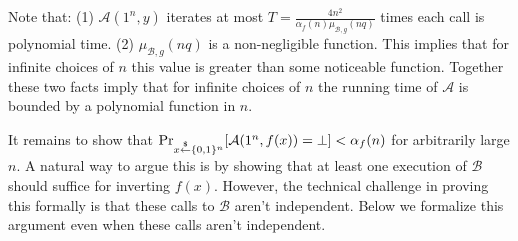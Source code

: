 Note that: (1) $\mathcal{A}(1^n, y)$ iterates at most $T = \frac{4n^2}{\alpha_f(n)\mu_{\mathcal{B},g}(nq)}$ times each call is polynomial time. (2) $\mu_{\mathcal{B},g}(nq)$ is a non-negligible function. This implies that for infinite choices of $n$ this value is greater than some noticeable function. Together these two facts imply that for infinite choices of $n$ the running time of $\mathcal{A}$ is bounded by a polynomial function in $n$.

It remains to show that $\Pr_{x \stackrel{\$}{\leftarrow} \{ 0, 1 \}^{n}}[ \mathcal{A}(1^n, f(x)) = \bot] < \alpha_f(n)$ for arbitrarily large $n$. A natural way to argue this is by showing that at least one execution of $\mathcal{B}$ should suffice for inverting $f(x)$. However, the technical challenge in proving this formally is that these calls to $\mathcal{B}$ aren't independent. Below we formalize this argument even when these calls aren't independent.

